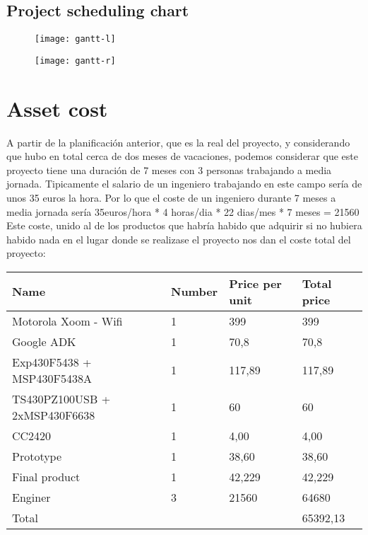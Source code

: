 	\newpage
	\subsection{Project scheduling chart}
	\begin{figure}[h]
		\centering
	    	\texttt{[image: gantt-l]}
		\label{fig:gantL}
	\end{figure}
	\newpage
	\begin{figure}[h]
		\centering
	    	\texttt{[image: gantt-r]}
		\label{fig:gantR}
	\end{figure}

\section{Asset cost}

	A partir de la planificación anterior, que es la real del proyecto, y considerando que hubo en total cerca de dos meses de vacaciones, podemos considerar que este proyecto tiene una duración de 7 meses con 3 personas trabajando a media jornada. Tipicamente el salario de un ingeniero trabajando en este campo sería de unos 35 euros la hora. Por lo que el coste de un ingeniero durante 7 meses a media jornada sería 35euros/hora * 4 horas/dia * 22 dias/mes * 7 meses = 21560\\

	Este coste, unido al de los productos que habría habido que adquirir si no hubiera habido nada en el lugar donde se realizase el proyecto nos dan el coste total del proyecto:\\

\begin{tabular}{| p{5cm} |l | l | l |} 
\hline
   Name & Number& Price per unit & Total price\\ \hline
   Motorola Xoom - Wifi & 1 & 399 & 399\\ \hline
   Google ADK & 1 & 70,8 & 70,8\\ \hline
   Exp430F5438 + MSP430F5438A & 1 & 117,89 & 117,89\\ \hline
   TS430PZ100USB + 2xMSP430F6638 & 1 & 60 & 60\\ \hline
   CC2420 & 1 & 4,00 & 4,00\\ \hline
   Prototype & 1 & 38,60 & 38,60\\ \hline
   Final product & 1 & 42,229 & 42,229\\ \hline
   Enginer & 3 & 21560 & 64680\\ \hline
   Total & & & 65392,13\\ \hline
\hline
\end{tabular}\\\\


